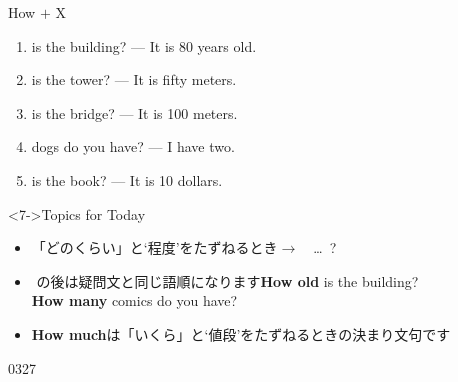 \documentclass[aspectratio=169,xcolor={dvipsnames,table}]{beamer}
\begin{document}
\begin{frame}[plain]{How $+$ X}

 \begin{enumerate}
  \item {} is the building? --- It is 80 years old.%
\hfill{}
  \item {} is the tower? --- It is fifty meters.%
\hfill{}
  \item {} is the bridge? --- It is 100 meters.
\hfill{}
  \item {} dogs do you have? --- I have two.
\hfill{}
  \item {} is the book? --- It is 10 dollars.
\hfill{}
 \end{enumerate}

\vspace{-1pt}

\begin{block}<7->{Topics for Today}\small
\begin{itemize}[square]\small
 \item<7-> 「どのくらい」と`程度'をたずねるとき$\longrightarrow$\,\,\,\,\,\,\ldots{}\,\,\,?
 \item<8-> \,\,の後は疑問文と同じ語順になります\hfill{\bfseries How old} is the building?\\
\hfill{}{\bfseries How many} comics do you have?
 \item<9->   {\bfseries How much}は「いくら」と`値段'をたずねるときの決まり文句です
\end{itemize}
     \end{block}
\vspace{-11pt}

\hfill{\tiny 0327}\,{\scriptsize{}}

\end{frame}
\end{document}
